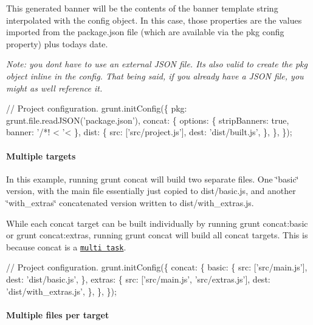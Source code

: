 This generated banner will be the contents of the {\ttfamily banner} template string interpolated with the config object. In this case, those properties are the values imported from the {\ttfamily package.\+json} file (which are available via the {\ttfamily pkg} config property) plus today\textquotesingle{}s date.

{\itshape Note\+: you don\textquotesingle{}t have to use an external J\+S\+ON file. It\textquotesingle{}s also valid to create the {\ttfamily pkg} object inline in the config. That being said, if you already have a J\+S\+ON file, you might as well reference it.}


\begin{DoxyCode}
// Project configuration.
grunt.initConfig(\{
  pkg: grunt.file.readJSON('package.json'),
  concat: \{
    options: \{
      stripBanners: true,
      banner: '/*! <%
        '<%
    \},
    dist: \{
      src: ['src/project.js'],
      dest: 'dist/built.js',
    \},
  \},
\});
\end{DoxyCode}


\paragraph*{Multiple targets}

In this example, running {\ttfamily grunt concat} will build two separate files. One \char`\"{}basic\char`\"{} version, with the main file essentially just copied to {\ttfamily dist/basic.\+js}, and another \char`\"{}with\+\_\+extras\char`\"{} concatenated version written to {\ttfamily dist/with\+\_\+extras.\+js}.

While each concat target can be built individually by running {\ttfamily grunt concat\+:basic} or {\ttfamily grunt concat\+:extras}, running {\ttfamily grunt concat} will build all concat targets. This is because {\ttfamily concat} is a \href{http://gruntjs.com/creating-tasks#multi-tasks}{\tt multi task}.


\begin{DoxyCode}
// Project configuration.
grunt.initConfig(\{
  concat: \{
    basic: \{
      src: ['src/main.js'],
      dest: 'dist/basic.js',
    \},
    extras: \{
      src: ['src/main.js', 'src/extras.js'],
      dest: 'dist/with\_extras.js',
    \},
  \},
\});
\end{DoxyCode}


\paragraph*{Multiple files per target}

